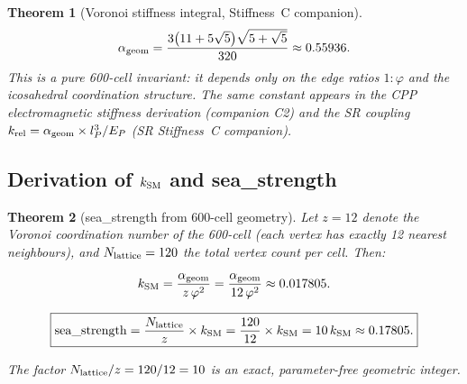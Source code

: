 \documentclass[11pt,letterpaper]{article}
\newtheorem{theorem}{Theorem}[section]
\newcommand{\phig}{\varphi}
\begin{document}
\begin{theorem}[Voronoi stiffness integral, Stiffness~C companion]
\label{thm:alpha_geom}
\begin{equation}
\alpha_{\rm geom}
= \frac{3\!\left(11 + 5\sqrt{5}\right)\!\sqrt{5 + \sqrt{5}}}{320}
\approx 0.55936.
\label{eq:alpha_geom}
\end{equation}
This is a pure 600-cell invariant: it depends only on the edge
ratios $1:\phig$ and the icosahedral coordination structure.  The
same constant appears in the CPP electromagnetic stiffness derivation
(companion C2) and the SR coupling $k_{\rm rel} = \alpha_{\rm geom}
\times l_P^3 / E_P$ (SR Stiffness~C companion).
\end{theorem}

\subsection{Derivation of $k_{\rm SM}$ and sea\_strength}

\begin{theorem}[sea\_strength from 600-cell geometry]
\label{thm:sea_strength}
Let $z = 12$ denote the Voronoi coordination number of the 600-cell
(each vertex has exactly 12 nearest neighbours), and
$N_{\rm lattice} = 120$ the total vertex count per cell.  Then:

\begin{equation}
k_{\rm SM} = \frac{\alpha_{\rm geom}}{z\,\phig^2}
= \frac{\alpha_{\rm geom}}{12\,\phig^2}
\approx 0.017805.
\label{eq:k_sm}
\end{equation}

\begin{equation}
\boxed{
\mathrm{sea\_strength} = \frac{N_{\rm lattice}}{z} \times k_{\rm SM}
= \frac{120}{12} \times k_{\rm SM}
= 10\,k_{\rm SM}
\approx 0.17805.}
\label{eq:sea_strength_derived}
\end{equation}

The factor $N_{\rm lattice}/z = 120/12 = 10$ is an exact,
parameter-free geometric integer.
\end{theorem}
\end{document}
